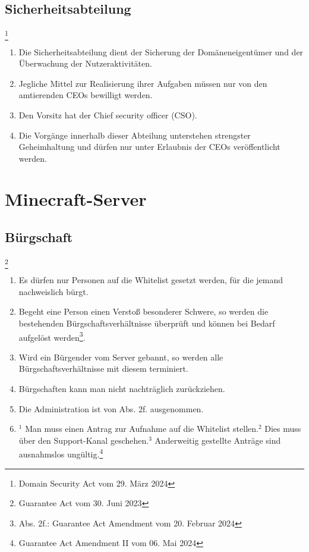 \documentclass{article}
\begin{document}
\subsection{Sicherheitsabteilung}\footnote{Domain Security Act vom 29. März 2024}
\begin{enumerate}[(1)]
	\item Die Sicherheitsabteilung dient der Sicherung der Domäneneigentümer und der Überwachung der Nutzeraktivitäten.
	\item Jegliche Mittel zur Realisierung ihrer Aufgaben müssen nur von den amtierenden CEOs bewilligt werden.
	\item Den Vorsitz hat der Chief security officer (CSO).
	\item Die Vorgänge innerhalb dieser Abteilung unterstehen strengster Geheimhaltung und dürfen nur unter Erlaubnis der CEOs veröffentlicht werden.
\end{enumerate}

\section{Minecraft-Server}

\subsection{Bürgschaft}\footnote{Guarantee Act vom 30. Juni 2023}
\begin{enumerate}[(1)]
	\item Es dürfen nur Personen auf die Whitelist gesetzt werden, für die jemand nachweislich bürgt.
	\item Begeht eine Person einen Verstoß besonderer Schwere, so werden die bestehenden Bürgschaftsverhältnisse überprüft und können bei Bedarf aufgelöst werden\footnote{Abs. 2f.: Guarantee Act Amendment vom 20. Februar 2024}.
	\item Wird ein Bürgender vom Server gebannt, so werden alle Bürgschaftsverhältnisse mit diesem terminiert.
	\item Bürgschaften kann man nicht nachträglich zurückziehen.
	\item Die Administration ist von Abs. 2f. ausgenommen.
	\item $^{1}$ Man muss einen Antrag zur Aufnahme auf die Whitelist stellen.$^{2}$ Dies muss über den Support-Kanal geschehen.$^{3}$ Anderweitig gestellte Anträge sind ausnahmslos ungültig.\footnote{Guarantee Act Amendment II vom 06. Mai 2024}
\end{enumerate}
\end{document}
